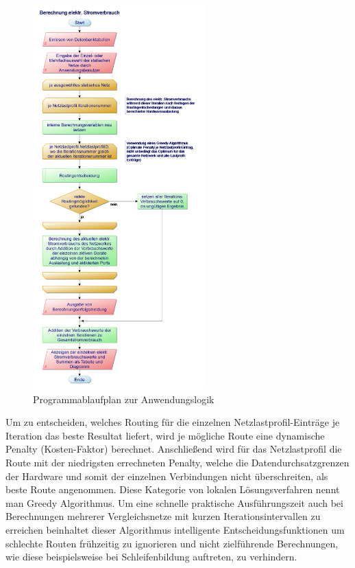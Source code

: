 \documentclass[12pt,titlepage]{article}
\begin{document}
\begin{figure}[htbp]
	\centering
	\includegraphics[width=0.6\textwidth]{1Berechnung_elektr_Stromverbrauch}
	\caption{Programmablaufplan zur Anwendungslogik}
	\label{fig:1Berechnung_elektr_Stromverbrauch}
\end{figure}
Um zu entscheiden, welches Routing für die einzelnen Netzlastprofil-Einträge je Iteration das beste Resultat liefert, wird je mögliche Route eine dynamische Penalty (Kosten-Faktor) berechnet. Anschließend wird für das Netzlastprofil die Route mit der niedrigsten errechneten Penalty, welche die Datendurchsatzgrenzen der Hardware und somit der einzelnen Verbindungen nicht überschreiten, als beste Route angenommen. Diese Kategorie von lokalen Lösungsverfahren nennt man Greedy Algorithmus. Um eine schnelle praktische Ausführungszeit auch bei Berechnungen mehrerer Vergleichsnetze mit kurzen Iterationsintervallen zu erreichen beinhaltet dieser Algorithmus intelligente Entscheidungsfunktionen um schlechte Routen frühzeitig zu ignorieren und nicht zielführende Berechnungen, wie diese beispielsweise bei Schleifenbildung auftreten, zu verhindern.
\end{document}
